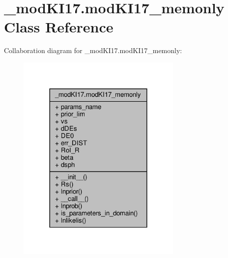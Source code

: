 \hypertarget{class__modKI17_1_1modKI17__memonly}{}\section{\+\_\+mod\+K\+I17.\+mod\+K\+I17\+\_\+memonly Class Reference}
\label{class__modKI17_1_1modKI17__memonly}


Collaboration diagram for \+\_\+mod\+K\+I17.\+mod\+K\+I17\+\_\+memonly\+:\nopagebreak
\begin{figure}[H]
\begin{center}
\leavevmode
\includegraphics[width=228pt]{da/d91/class__modKI17_1_1modKI17__memonly__coll__graph}
\end{center}
\end{figure}
